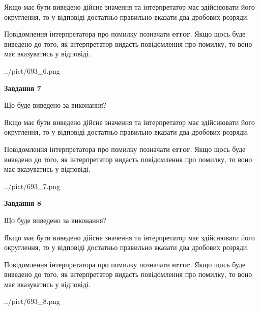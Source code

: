 \documentclass[12pt, ukrainian]{article}
\begin{document}
{\begin {Large}
Якщо має бути виведено дійсне значення та інтерпретатор має здійснювати його округлення, 
то у відповіді достатньо правильно вказати два дробових розряди.

Повідомлення інтерпретатора про помилку позначати \textbf{error}.
Якщо щось буде виведено до того, як інтерпретатор видасть повідомлення про помилку, 
то воно має вказуватись у відповіді. \par

\begin{center}
	{../pict/693_6.png}
\end{center}
\newpage

{\begin {center}\textbf{Завдання 7}\end {center}}\par
Що буде виведено за виконання? \par

Якщо має бути виведено дійсне значення та інтерпретатор має здійснювати його округлення, 
то у відповіді достатньо правильно вказати два дробових розряди.

Повідомлення інтерпретатора про помилку позначати \textbf{error}.
Якщо щось буде виведено до того, як інтерпретатор видасть повідомлення про помилку, 
то воно має вказуватись у відповіді. \par

\begin{center}
	{../pict/693_7.png}
\end{center}
\newpage

{\begin {center}\textbf{Завдання 8}\end {center}}\par
Що буде виведено за виконання? \par

Якщо має бути виведено дійсне значення та інтерпретатор має здійснювати його округлення, 
то у відповіді достатньо правильно вказати два дробових розряди.

Повідомлення інтерпретатора про помилку позначати \textbf{error}.
Якщо щось буде виведено до того, як інтерпретатор видасть повідомлення про помилку, 
то воно має вказуватись у відповіді. \par

\begin{center}
	{../pict/693_8.png}
\end{center}
\newpage


\end{Large}}
\end{document}
